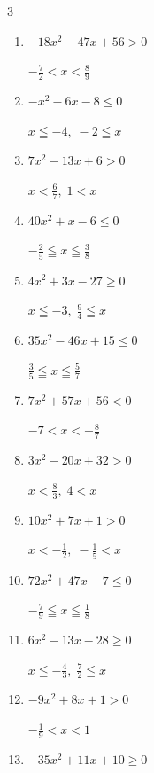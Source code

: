 \begin{multicols}{3}
\begin{enumerate}
  \item $-18x^{2}-47x+56>0$

        $\displaystyle -\frac{7}{2} < x < \frac{8}{9}$

  \item $-x^{2}-6x-8\leq 0$

        $\displaystyle x \leqq -4 , \; -2 \leqq x$

  \item $7x^{2}-13x+6>0$

        $\displaystyle x < \frac{6}{7} , \; 1 < x$

  \item $40x^{2}+x-6\leq 0$

        $\displaystyle -\frac{2}{5} \leqq x \leqq \frac{3}{8}$

  \item $4x^{2}+3x-27\geq 0$

        $\displaystyle x \leqq -3 , \; \frac{9}{4} \leqq x$

  \item $35x^{2}-46x+15\leq 0$

        $\displaystyle \frac{3}{5} \leqq x \leqq \frac{5}{7}$

  \item $7x^{2}+57x+56<0$

        $\displaystyle -7 < x < -\frac{8}{7}$

  \item $3x^{2}-20x+32>0$

        $\displaystyle x < \frac{8}{3} , \; 4 < x$

\columnbreak %

  \item $10x^{2}+7x+1>0$

        $\displaystyle x < -\frac{1}{2} , \; -\frac{1}{5} < x$

  \item $72x^{2}+47x-7\leq 0$

        $\displaystyle -\frac{7}{9} \leqq x \leqq \frac{1}{8}$

  \item $6x^{2}-13x-28\geq 0$

        $\displaystyle x \leqq -\frac{4}{3} , \; \frac{7}{2} \leqq x$

  \item $-9x^{2}+8x+1>0$

        $\displaystyle -\frac{1}{9} < x < 1$

  \item $-35x^{2}+11x+10\geq 0$


\end{enumerate}
\end{multicols}
